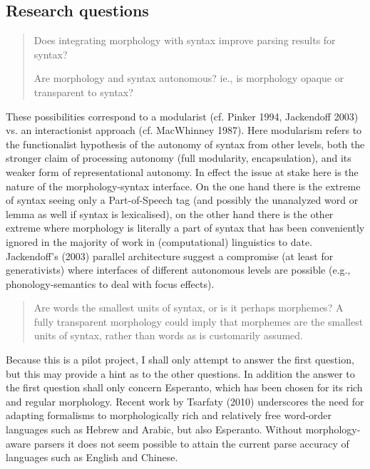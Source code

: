 \documentclass[10pt,a4paper]{article}
\begin{document}
\subsection{Research questions}

\begin{quote}
Does integrating morphology with syntax improve parsing results for
syntax?

Are morphology and syntax autonomous? ie., is morphology opaque or
transparent to syntax? 
\end{quote}

These possibilities correspond to a modularist (cf.  Pinker 1994, Jackendoff
2003) vs. an interactionist approach (cf.  MacWhinney 1987). Here modularism
refers to the functionalist hypothesis of the autonomy of syntax from other
levels, both the stronger claim of processing autonomy (full modularity,
encapsulation), and its weaker form of representational autonomy. In effect the
issue at stake here is the nature of the morphology-syntax interface. On the
one hand there is the extreme of syntax seeing only a Part-of-Speech tag (and
possibly the unanalyzed word or lemma as well if syntax is lexicalised), on the
other hand there is the other extreme where morphology is literally a part of
syntax that has been conveniently ignored in the majority of work in
(computational) linguistics to date.  Jackendoff's (2003) parallel architecture
suggest a compromise (at least for generativists) where interfaces of different
autonomous levels are possible (e.g., phonology-semantics to deal with focus
effects).

\begin{quote}
Are words the smallest units of syntax, or is it perhaps morphemes? A
fully transparent morphology could imply that morphemes are the smallest units
of syntax, rather than words as is customarily assumed.
\end{quote}

Because this is a pilot project, I shall only attempt to answer the first
question, but this may provide a hint as to the other questions. In addition
the answer to the first question shall only concern Esperanto, which has been
chosen for its rich and regular morphology. Recent work by Tsarfaty (2010)
underscores the need for adapting formalisms to morphologically rich and
relatively free word-order languages such as Hebrew and Arabic, but also
Esperanto. Without morphology-aware parsers it does not seem possible to attain
the current parse accuracy of languages such as English and Chinese.
\end{document}
